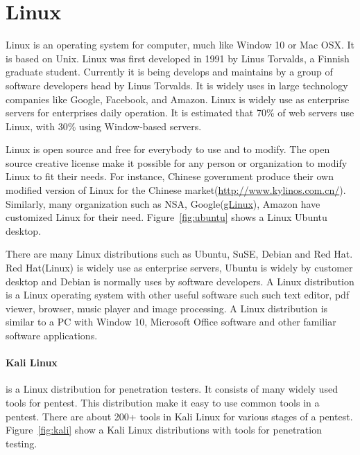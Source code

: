 \documentclass[7x9]{times}
\begin{document}
\section{Linux}

Linux\cite{sobell2015practical,barrett2016linux} is an operating
system for computer, much like Window 10 or Mac OSX. It is based on
Unix. Linux was first developed in 1991 by Linus Torvalds, a Finnish
graduate student. Currently it is being develops and maintains by a
group of software developers head by Linus Torvalds. It is widely uses
in large technology companies like Google, Facebook, and Amazon. Linux
is widely use as enterprise servers for enterprises daily
operation. It is estimated that 70\% of web servers use Linux, with
30\% using Window-based servers.

Linux is open source and free for everybody to use and to modify. The
open source creative license make it possible for any person or
organization to modify Linux to fit their needs. For instance, Chinese
government produce their own modified version of Linux for the Chinese
market(\url{http://www.kylinos.com.cn/}). Similarly, many organization
such as NSA, Google(\url{gLinux}), Amazon have customized Linux for
their need. Figure~\ref{fig:ubuntu} shows a Linux Ubuntu desktop.

There are many Linux distributions such as Ubuntu, SuSE, Debian and
Red Hat. Red Hat(Linux) is widely use as enterprise servers, Ubuntu is
widely by customer desktop and Debian is normally uses by software
developers. A Linux distribution is a Linux operating system with
other useful software such such text editor, pdf viewer, browser,
music player and image processing. A Linux distribution is similar to
a PC with Window 10, Microsoft Office software and other familiar
software applications.



\paragraph{Kali Linux}is a Linux distribution for penetration
testers. It consists of many widely used tools for pentest. This
distribution make it easy to use common tools in a pentest. There are
about 200+ tools in Kali Linux for various stages of a
pentest. Figure~\ref{fig:kali} show a Kali Linux distributions with
tools for penetration testing.
\end{document}
